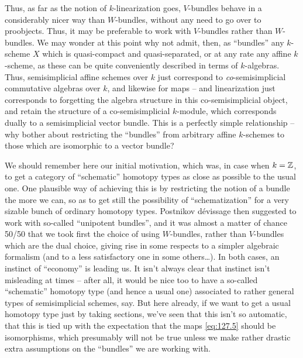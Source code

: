 Thus, as far as the notion of $k$-linearization goes, $V$-bundles
behave in a considerably nicer way than $W$-bundles, without any need
to go over to proobjects. Thus, it may be preferable to work with
$V$-bundles rather than $W$-bundles. We may wonder at this point why
not admit, then, as ``bundles'' any $k$-scheme $X$ which is
quasi-compact and quasi-separated, or at any rate any affine
$k$-scheme, as these can be quite conveniently described in terms of
$k$-algebras. Thus, semisimplicial affine schemes over $k$ just
correspond to \emph{co}-semisimplicial commutative algebras over $k$,
and likewise for maps -- and linearization just corresponds to
forgetting the algebra structure in this co-semisimplicial object, and
retain the structure of a co-semisimplicial $k$-module, which
corresponds dually to a semisimplicial vector bundle. This is a
perfectly simple relationship -- why bother about restricting the
``bundles'' from arbitrary affine $k$-schemes to those which are
isomorphic to a vector bundle?

We should remember here our initial motivation, which was, in case
when $k={\mathbb{Z}}$, to get a category of ``schematic'' homotopy types as
close as possible to the usual one. One plausible way of achieving
this is by restricting the notion of a bundle the more we can, so as
to get still the possibility of ``schematization'' for a very sizable
bunch of ordinary homotopy types. Postnikov dévissage then suggested
to work with so-called ``unipotent bundles'', and it was
almost a matter of chance 50/50 that we took first the
choice of using $W$-bundles, rather than $V$-bundles which are the
dual choice, giving rise in some respects to a simpler algebraic
formalism (and to a less satisfactory one in some others\dots). In
both cases, an instinct of ``economy'' is leading us. It isn't always
clear that instinct isn't misleading at times -- after all, it would
be nice too to have a so-called ``schematic'' homotopy type (and hence
a usual one) associated to rather general types of semisimplicial
schemes, say. But here already, if we want to get a usual homotopy
type just by taking sections, we've seen that this isn't so automatic,
that this is tied up with the expectation that the maps
\eqref{eq:127.5} should be isomorphisms, which presumably will not be
true unless we make rather drastic extra assumptions on the
``bundles'' we are working with.

